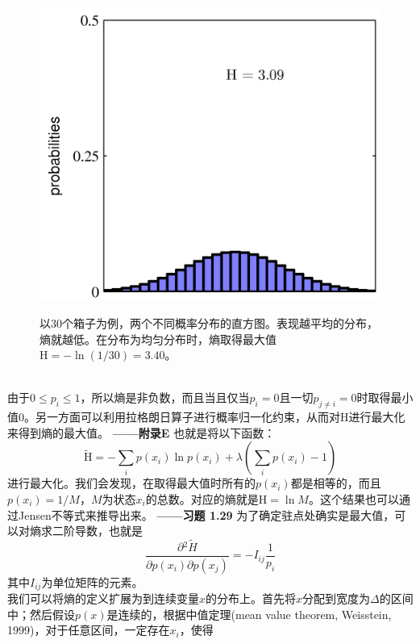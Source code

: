 \documentclass[b5paper]{book}
\numberwithin{equation}{chapter}
\begin{document}
{\begin{figure}[ht]
		\begin{minipage}[t]{0.5\linewidth}
		\includegraphics[scale=0.8]{Images/1-30b.png}
		\label{fig:1-30b}
		\end{minipage}
		\caption{以30个箱子为例，两个不同概率分布的直方图。表现越平均的分布，熵就越低。在分布为均匀分布时，熵取得最大值$\mathrm{H}=-\ln (1/30) =3.40$。}
	\end{figure}
	\\
	\indent 由于$0 \leqslant p_i \leqslant 1$，所以熵是非负数，而且当且仅当$p_i=0$且一切$p_{j \neq i} =0$时取得最小值0。另一方面可以利用拉格朗日算子进行概率归一化约束，从而对$\mathrm{H}$进行最大化来得到熵的最大值。\color{red} \textbf{——附录E} \color{black}也就是将以下函数：
	\begin{equation}
		\widetilde{\mathrm{H}} = -\sum_i p(x_i) \ln p(x_i) + \lambda \left(\sum_i p(x_i)-1 \right)
	\end{equation}
	进行最大化。我们会发现，在取得最大值时所有的$p(x_i)$都是相等的，而且$p(x_i)=1/M$，$M$为状态$x_i$的总数。对应的熵就是$\mathrm{H} = \ln M$。这个结果也可以通过Jensen不等式来推导出来。\color{red} \textbf{——习题 1.29} \color{black}为了确定驻点处确实是最大值，可以对熵求二阶导数，也就是
	\begin{equation}
		\frac{\partial\mathrm{^2} \widetilde{H}}{\partial p(x_i) \partial p(x_j)} = -I_{ij}\frac{1}{p_i}
	\end{equation}
	其中$I_{ij}$为单位矩阵的元素。\\
	\indent 我们可以将熵的定义扩展为到连续变量$x$的分布上。首先将$x$分配到宽度为$\Delta$的区间中；然后假设$p(x)$是连续的，根据中值定理(mean value theorem, Weisstein, 1999)，对于任意区间，一定存在$x_i$，使得
}
\end{document}
